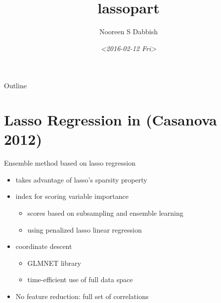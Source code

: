 \documentclass[bigger]{beamer}
\author{Nooreen S Dabbish}
\date{\textit{<2016-02-12 Fri>}}
\title{lassopart}
\begin{document}
\maketitle
\begin{frame}{Outline}
\tableofcontents
\end{frame}



\section{Lasso Regression in (Casanova 2012)}
\label{sec-1}

\begin{frame}[label=sec-1-0-1]{Ensemble method based on lasso regression}
\begin{itemize}
\item takes advantage of lasso's sparsity property
\item index for scoring variable importance
\begin{itemize}
\item scores based on subsampling and ensemble learning
\item using penalized lasso linear regression
\end{itemize}
\item coordinate descent
\begin{itemize}
\item GLMNET library
\item time-efficient use of full data space
\end{itemize}
\item No feature reduction: full set of correlations
\end{itemize}
\end{frame}
\end{document}
